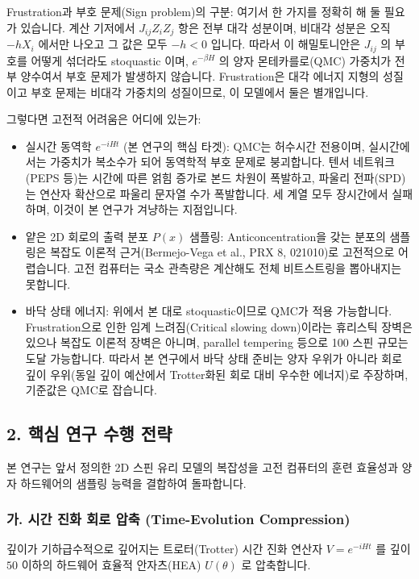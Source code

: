 \documentclass[11pt,a4paper]{article}
\begin{document}
Frustration과 부호 문제(Sign problem)의 구분:
여기서 한 가지를 정확히 해 둘 필요가 있습니다. 계산 기저에서 $J_{ij} Z_i Z_j$ 항은 전부 대각 성분이며, 비대각 성분은 오직 $-h X_i$ 에서만 나오고 그 값은 모두 $-h < 0$ 입니다. 따라서 이 해밀토니안은 $J_{ij}$ 의 부호를 어떻게 섞더라도 stoquastic 이며, $e^{-\beta H}$ 의 양자 몬테카를로(QMC) 가중치가 전부 양수여서 부호 문제가 발생하지 않습니다. Frustration은 대각 에너지 지형의 성질이고 부호 문제는 비대각 가중치의 성질이므로, 이 모델에서 둘은 별개입니다.

그렇다면 고전적 어려움은 어디에 있는가:
\begin{itemize}

\item 실시간 동역학 $e^{-iHt}$ (본 연구의 핵심 타겟): QMC는 허수시간 전용이며, 실시간에서는 가중치가 복소수가 되어 동역학적 부호 문제로 붕괴합니다. 텐서 네트워크(PEPS 등)는 시간에 따른 얽힘 증가로 본드 차원이 폭발하고, 파울리 전파(SPD)는 연산자 확산으로 파울리 문자열 수가 폭발합니다. 세 계열 모두 장시간에서 실패하며, 이것이 본 연구가 겨냥하는 지점입니다.
\item 얕은 2D 회로의 출력 분포 $P(x)$ 샘플링: Anticoncentration을 갖는 분포의 샘플링은 복잡도 이론적 근거(Bermejo-Vega et al., PRX 8, 021010)로 고전적으로 어렵습니다. 고전 컴퓨터는 국소 관측량은 계산해도 전체 비트스트링을 뽑아내지는 못합니다.
\item 바닥 상태 에너지: 위에서 본 대로 stoquastic이므로 QMC가 적용 가능합니다. Frustration으로 인한 임계 느려짐(Critical slowing down)이라는 휴리스틱 장벽은 있으나 복잡도 이론적 장벽은 아니며, parallel tempering 등으로 100 스핀 규모는 도달 가능합니다. 따라서 본 연구에서 바닥 상태 준비는 양자 우위가 아니라 회로 깊이 우위(동일 깊이 예산에서 Trotter화된 회로 대비 우수한 에너지)로 주장하며, 기준값은 QMC로 잡습니다.
\end{itemize}

\subsection*{2. 핵심 연구 수행 전략}

본 연구는 앞서 정의한 2D 스핀 유리 모델의 복잡성을 고전 컴퓨터의 훈련 효율성과 양자 하드웨어의 샘플링 능력을 결합하여 돌파합니다.

\subsubsection*{가. 시간 진화 회로 압축 (Time-Evolution Compression)}
깊이가 기하급수적으로 깊어지는 트로터(Trotter) 시간 진화 연산자 $V = e^{-iHt}$ 를 깊이 $50$ 이하의 하드웨어 효율적 안자츠(HEA) $U(\theta)$ 로 압축합니다.
\end{document}
